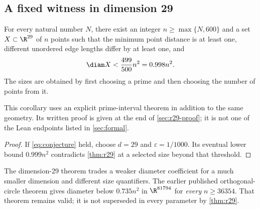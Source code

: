 \subsection{A fixed witness in dimension 29}

\begin{theorem}[Dimension 29]\label{thm:r29}
For every natural number $N$, there exist an integer
$n\ge\max\{N,600\}$ and a set $X\subset\R^{29}$
of $n$ points such that the minimum point distance is at least one, different
unordered edge lengths differ by at least one, and
\[
 \diam X<\frac{499}{500}n^2=0.998n^2.
\]
The sizes are obtained by first choosing a prime and then choosing the
number of points from it.
\end{theorem}

This corollary uses an explicit prime-interval theorem in addition to the
same geometry. Its written proof is given at the end of
\cref{sec:r29-proof}; it is not one of the Lean endpoints listed in
\cref{sec:formal}.

\begin{proof}
If \eqref{eq:conjecture} held, choose $d=29$ and $\varepsilon=1/1000$.
Its eventual lower bound $0.999n^2$ contradicts \cref{thm:r29} at a selected
size beyond that threshold.
\end{proof}

The dimension-29 theorem trades a weaker diameter coefficient for a much
smaller dimension and different size quantifiers. The earlier published
orthogonal-circle theorem \cite{PublishedFinite} gives diameter below
$0.735n^2$ in $\R^{81794}$ for \emph{every} $n\ge36354$. That theorem remains
valid; it is not superseded in every parameter by \cref{thm:r29}.

